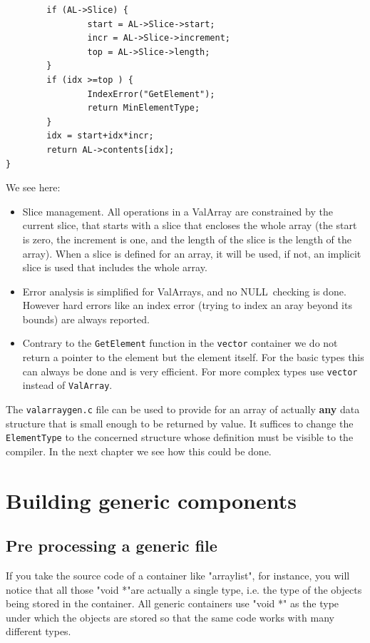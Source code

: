\documentclass[12pt,a4paper]{memoir} %
\newif\iftth
\newcommand{\Null}{{\iftth \ NULL \else \footnotesize NULL\  \fi}}
\begin{document}
{{\begin{verbatim}
        if (AL->Slice) {
                start = AL->Slice->start;
                incr = AL->Slice->increment;
                top = AL->Slice->length;
        }
        if (idx >=top ) {
                IndexError("GetElement");
                return MinElementType;
        }
        idx = start+idx*incr;
        return AL->contents[idx];
}
\end{verbatim}
We see here:
\begin{itemize}
\item Slice management. All operations in a ValArray are constrained by the current slice, that starts with a slice that encloses the whole array 
(the start is zero, the increment is one, and the length of the slice is the length of the array). When a slice is defined for an array, it will be
used, if not, an implicit slice is used that includes the whole array.
\item Error analysis is simplified for ValArrays, and no \Null checking is done. However hard errors like an index error (trying to index an aray beyond
its bounds) are always reported.
\item Contrary to the \verb,GetElement, function in the \verb,vector, container we do not return a pointer to the element but the element
itself. For the basic types this can always be done and is very efficient. For more complex types use \verb,vector, instead of \verb,ValArray,.

\end{itemize}
The \verb,valarraygen.c, file can be used to provide for an array of actually \textbf{any} data structure that is small enough to be returned by value.
It suffices to change the \verb,ElementType, to the concerned structure whose definition must be visible to the compiler. In the next chapter we see how this
could be done.

\chapter{Building generic components}
\section{Pre processing a generic file}
If you take the source code of a container like "arraylist", for instance, you will notice that all those "void *"are actually a single type, i.e. the type of the objects being stored in the container.  All generic containers use "void *" as the type under which the objects are stored so that the same code works with many different types.

}}
\end{document}
